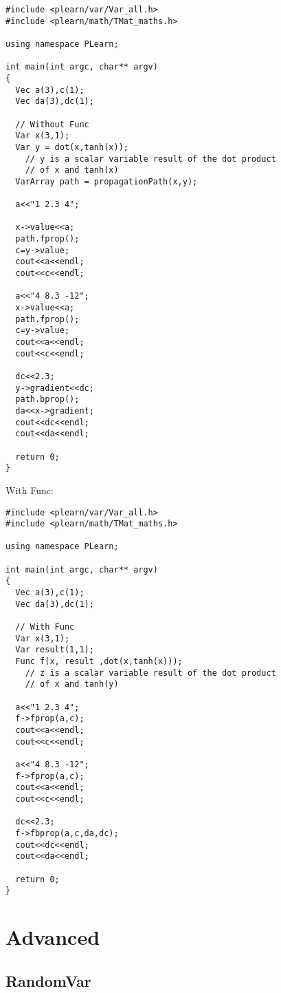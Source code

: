 \documentclass[11pt]{book}
\begin{document}
\begin{verbatim}
#include <plearn/var/Var_all.h>
#include <plearn/math/TMat_maths.h>

using namespace PLearn;

int main(int argc, char** argv)
{
  Vec a(3),c(1);
  Vec da(3),dc(1);

  // Without Func
  Var x(3,1);
  Var y = dot(x,tanh(x));
    // y is a scalar variable result of the dot product
    // of x and tanh(x)
  VarArray path = propagationPath(x,y);

  a<<"1 2.3 4";

  x->value<<a;
  path.fprop();
  c=y->value;
  cout<<a<<endl;
  cout<<c<<endl;

  a<<"4 8.3 -12";
  x->value<<a;
  path.fprop();
  c=y->value;
  cout<<a<<endl;
  cout<<c<<endl;

  dc<<2.3;
  y->gradient<<dc;
  path.bprop();
  da<<x->gradient;
  cout<<dc<<endl;
  cout<<da<<endl;

  return 0;
}
\end{verbatim}

With Func:

\begin{verbatim}
#include <plearn/var/Var_all.h>
#include <plearn/math/TMat_maths.h>

using namespace PLearn;

int main(int argc, char** argv)
{
  Vec a(3),c(1);
  Vec da(3),dc(1);

  // With Func
  Var x(3,1);
  Var result(1,1);
  Func f(x, result ,dot(x,tanh(x)));
    // z is a scalar variable result of the dot product
    // of x and tanh(y)

  a<<"1 2.3 4";
  f->fprop(a,c);
  cout<<a<<endl;
  cout<<c<<endl;

  a<<"4 8.3 -12";
  f->fprop(a,c);
  cout<<a<<endl;
  cout<<c<<endl;

  dc<<2.3;
  f->fbprop(a,c,da,dc);
  cout<<dc<<endl;
  cout<<da<<endl;

  return 0;
}
\end{verbatim}


\chapter{Advanced}

\section{RandomVar}
\end{document}

